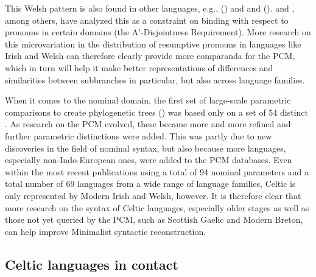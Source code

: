\documentclass[output=paper,colorlinks,citecolor=brown]{langscibook}
\begin{document}
\noindent This Welsh pattern is also found in other languages, e.g.,  (\citealt{mm:toman_discussion_1998}) and  and  (\citealt{mm:ouhalla_subject-extraction_1993}). \citet{mm:mccloskey_resumptive_1990} and \citet{mm:willis2000distribution}, among others, have analyzed this as a constraint on binding with respect to pronouns in certain domains (the A'-Disjointness Requirement). More research on this microvariation in the distribution of resumptive pronouns in languages like Irish and Welsh can therefore clearly provide more comparanda for the PCM, which in turn will help it make better representations of differences and similarities between subbranches in particular, but also across language families.

When it comes to the nominal domain, the first set of large-scale parametric comparisons to create phylogenetic trees (\citealt{mm:guardiano_parametric_2005}) was based only on a set of 54 distinct . As research on the PCM evolved, these  became more and more refined and further parametric distinctions were added. This was partly due to new discoveries in the field of nominal syntax, but also because more languages, especially non-Indo-European ones, were added to the PCM databases. Even within the most recent publications using a total of 94 nominal parameters and a total number of 69 languages from a wide range of language families, Celtic is only represented by Modern Irish and Welsh, however. It is therefore clear that more research on the syntax of Celtic languages, especially older stages as well as those not yet queried by the PCM, such as Scottish Gaelic and Modern Breton, can help improve Minimalist syntactic reconstruction.

\subsection{Celtic languages in contact}
\label{sec:celticcontact}
\end{document}
